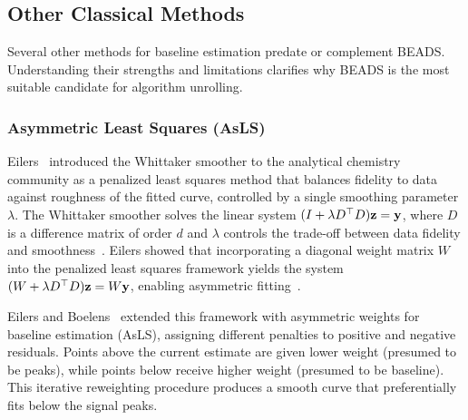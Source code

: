 

\subsection{Other Classical Methods}
\label{sec:bg_other_classical}

Several other methods for baseline estimation predate or complement BEADS. Understanding their strengths and limitations clarifies why BEADS is the most suitable candidate for algorithm unrolling.

\subsubsection{Asymmetric Least Squares (AsLS)}

Eilers~\cite{eilers2003smoother} introduced the Whittaker smoother to the analytical chemistry community as a penalized least squares method that balances fidelity to data against roughness of the fitted curve, controlled by a single smoothing parameter $\lambda$. The Whittaker smoother solves the linear system $(I + \lambda D^\top D)\mathbf{z} = \mathbf{y}$, where $D$ is a difference matrix of order $d$ and $\lambda$ controls the trade-off between data fidelity and smoothness~\cite{eilers2003smoother}. Eilers showed that incorporating a diagonal weight matrix $W$ into the penalized least squares framework yields the system $(W + \lambda D^\top D)\mathbf{z} = W\mathbf{y}$, enabling asymmetric fitting~\cite{eilers2003smoother}.

Eilers and Boelens~\cite{eilers2005baseline} extended this framework with asymmetric weights for baseline estimation (AsLS), assigning different penalties to positive and negative residuals. Points above the current estimate are given lower weight (presumed to be peaks), while points below receive higher weight (presumed to be baseline). This iterative reweighting procedure produces a smooth curve that preferentially fits below the signal peaks.

